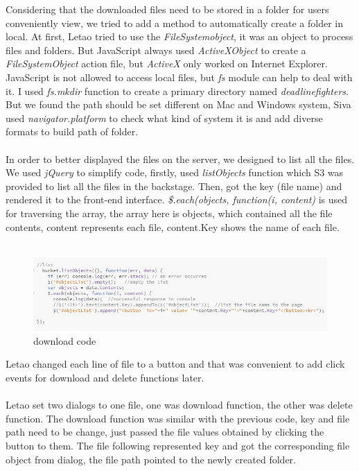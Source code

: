 \documentclass[a4paper]{article}
\begin{document}
{Considering that the downloaded files need to be stored in a folder for users conveniently view, we tried to add a method to automatically create a folder in local. At first, Letao tried to use the \emph{FileSystemobject}, it was an object to process files and folders. But JavaScript always used \emph{ActiveXObject} to create a \emph{FileSystemObject} action file, but \emph{ActiveX} only worked on Internet Explorer. JavaScript is not allowed to access local files, but \emph{fs} module can help to deal with it. I used \emph{fs.mkdir} function to create a primary directory named \emph{deadlinefighters}. But we found the path should be set different on Mac and Windows system, Siva used \emph{navigator.platform} to check what kind of system it is and add diverse formats to build path of folder.\\\\


In order to better displayed the files on the server, we designed to list all the files. We used \emph{jQuery} to simplify code, firstly, used \emph{listObjects} function which S3 was provided to list all the files in the backstage. Then, got the key (file name) and rendered it to the front-end interface. \emph{\$.each(objects, function(i, content)} is used for traversing the array, the array here is objects, which contained all the file contents, content represents each file, content.Key shows the name of each file.\\\\

\begin{figure}[h!]
\centering
\includegraphics[scale=1.2]{code2}
\caption{download code}
\label{fig:code2}
\end{figure}

Letao changed each line of file to a button and that was convenient to add click events for download and delete functions later.\\\\
Letao set two dialogs to one file, one was download function, the other was delete function. The download function was similar with the previous code, key and file path need to be change, just passed the file values obtained by clicking the button to them. The file following represented key and got the corresponding file object from dialog, the file path pointed to the newly created folder.\\\\

}
\end{document}
